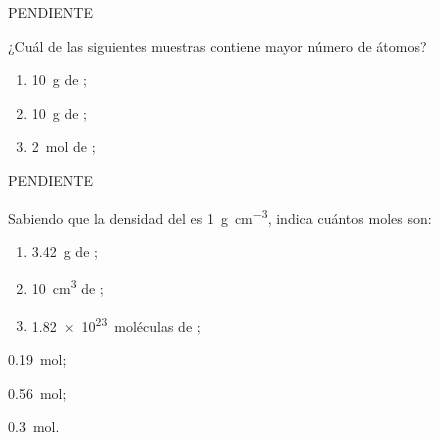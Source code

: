 \begin{solution}
  PENDIENTE %
\end{solution}




\begin{exercise}[
    tags    = {termodinámica, entalpía, entalpia de reacción, calor},
    topics  = {química, termoquímica, termodinámica},
    source  = {FQ 1B OXF 2015, p43, e31},
  ]
  ¿Cuál de las siguientes muestras contiene mayor número de átomos?
  \begin{enumerate}
    \item \SI{10}{\gram} de ;
    \item \SI{10}{\gram} de ;
    \item \SI{2}{\mole} de ;
  \end{enumerate}
\end{exercise}

\begin{solution}
  PENDIENTE %
\end{solution}




\begin{exercise}[
    tags    = {termodinámica, entalpía, entalpia de reacción, calor},
    topics  = {química, termoquímica, termodinámica},
    source  = {FQ 1B OXF 2015, p43, e34},
  ]
  Sabiendo que la densidad del  es \SI{1}{\gram\per\cubic\centi\meter}, indica cuántos moles son:
  \begin{enumerate}
    \item \SI{3.42}{\gram} de ;
    \item \SI{10}{\cubic\centi\meter} de ;
    \item \SI{1.82e23}{moléculas} de ;
  \end{enumerate}
\end{exercise}

\begin{solution}
  \begin{enumerate*}
    \item \SI{0.19}{\mole};
    \item \SI{0.56}{\mole};
    \item \SI{0.3}{\mole}.
  \end{enumerate*}
\end{solution}



